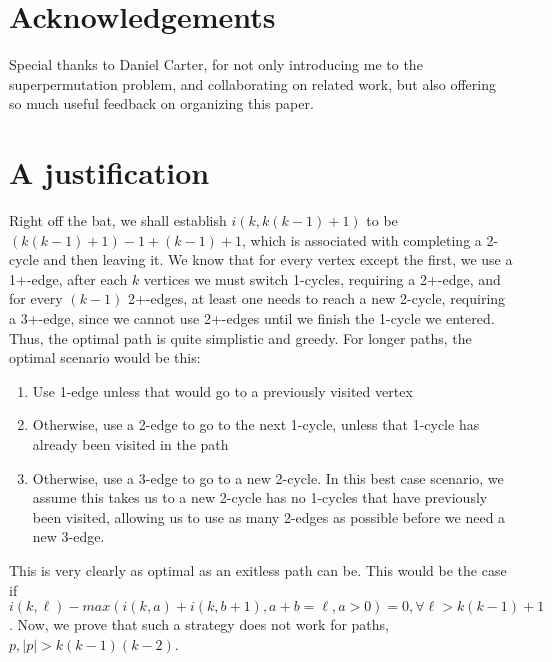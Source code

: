 \documentclass{article}
\newcommand{\edit}[1]{}%
\newcommand{\rough}[1]{}%
\begin{document}
\section{Acknowledgements}

Special thanks to Daniel Carter, for not only introducing me to the superpermutation problem, and collaborating on related work, but also offering so much useful feedback on organizing this paper.

\newpage

\appendix

\section{A justification} \label{intuition}

\rough{FIRST BOUND} Right off the bat, we shall establish $i(k,k(k-1)+1)$ to be $(k(k-1)+1)-1 + (k-1) + 1$, which is associated with completing a 2-cycle and then leaving it.\edit{ 2-cycle not established} We know that for every vertex except the first, we use a 1+-edge, after each $k$ vertices we must switch 1-cycles, requiring a 2+-edge, and for every $(k-1)$ 2+-edges, at least one needs to reach a new 2-cycle, requiring a 3+-edge, since we cannot use 2+-edges until we finish the 1-cycle we entered.\edit{ could make more concise} Thus, the optimal path is quite simplistic and greedy. For longer paths, the optimal scenario would be this:\edit{ should say this earlier, illustrates my point well and is readable}

\begin{enumerate}
    \item Use 1-edge unless that would go to a previously visited vertex
    \item Otherwise, use a 2-edge to go to the next 1-cycle, unless that 1-cycle has already been visited in the path
    \item Otherwise, use a 3-edge to go to a new 2-cycle. In this best case scenario, we assume this takes us to a new 2-cycle has no 1-cycles that have previously been visited, allowing us to use as many 2-edges as possible before we need a new 3-edge.
\end{enumerate}

This is very clearly as optimal as an exitless path can be. This would be the case if $i(k,\ell)-max(i(k,a)+i(k,b+1), a+b=\ell, a > 0) = 0, \forall \ell > k(k-1)+1$. Now, we prove that such a strategy does not work for paths, $p, |p| > k(k-1)(k-2)$.

\vspace{1.75em}
\end{document}
